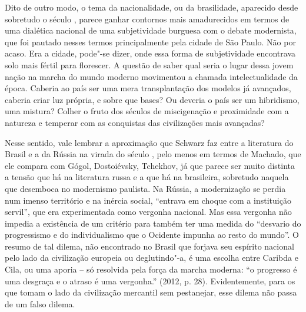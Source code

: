{Dito de outro modo, o tema da nacionalidade, ou da brasilidade,
aparecido desde sobretudo o século , parece ganhar contornos mais
amadurecidos em termos de uma dialética nacional de uma subjetividade
burguesa com o debate modernista, que foi pautado nesses termos
principalmente pela cidade de São Paulo. Não por acaso. Era a cidade,
pode"-se dizer, onde essa forma de subjetividade encontrava solo mais
fértil para florescer. A questão de saber qual seria o lugar dessa jovem
nação na marcha do mundo moderno movimentou a chamada intelectualidade
da época. Caberia ao país ser uma mera transplantação dos modelos já
avançados, caberia criar luz própria, e sobre que bases? Ou deveria o
país ser um hibridismo, uma mistura? Colher o fruto dos séculos de
miscigenação e proximidade com a natureza e temperar com as conquistas
das civilizações mais avançadas?

Nesse sentido, vale lembrar a aproximação que Schwarz faz entre a
literatura do Brasil e a da Rússia na virada do século , pelo menos em
termos de Machado, que ele compara com Gógol, Dostoiévsky, Tchekhov, já
que parece ser muito distinta a tensão que há na literatura russa e a
que há na brasileira, sobretudo naquela que desemboca no modernismo
paulista. Na Rússia, a modernização se perdia num imenso território e na
inércia social, ``entrava em choque com a instituição servil'', que era
experimentada como vergonha nacional. Mas essa vergonha não impedia a
existência de um critério para também ter uma medida do ``desvario do
progressismo e do individualismo que o Ocidente impunha ao resto do
mundo''. O resumo de tal dilema, não encontrado no Brasil que forjava
seu espírito nacional pelo lado da civilização europeia ou deglutindo"-a,
é uma escolha entre Caribda e Cila, ou uma aporia -- só resolvida pela
força da marcha moderna: ``o progresso é uma desgraça e o atraso é uma
vergonha.'' (2012, p. 28). Evidentemente, para os que tomam o lado da
civilização mercantil sem pestanejar, esse dilema não passa de um falso
dilema.

}
